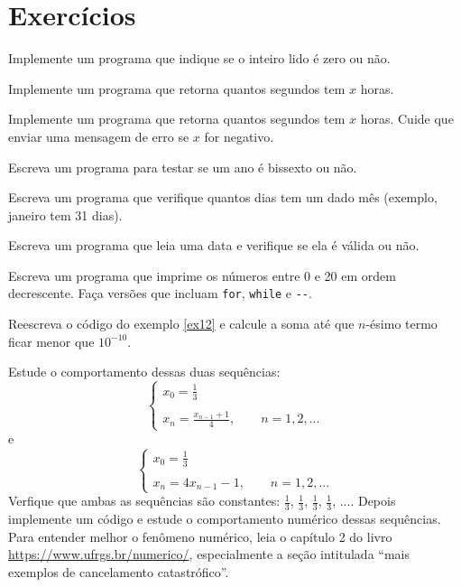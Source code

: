 \section{Exercícios}
\begin{exer}Implemente um programa que indique se o inteiro lido é zero ou não.
\end{exer}
\begin{exer}Implemente um programa que retorna quantos segundos tem $x$ horas.
\end{exer}
\begin{exer}Implemente um programa que retorna quantos segundos tem $x$ horas. Cuide que enviar uma mensagem de erro se $x$ for negativo.
\end{exer}
\begin{exer}\label{exerc3.1}Escreva um programa para testar se um ano é bissexto ou não.
\end{exer}
\begin{exer}\label{exerc3.2}Escreva um programa que verifique quantos dias tem um dado mês (exemplo, janeiro tem 31 dias).
\end{exer}
\begin{exer}\label{exerc3.3}Escreva um programa que leia uma data e verifique se ela é válida ou não.
\end{exer}
\begin{exer}Escreva um programa que imprime os números entre 0 e 20 em ordem decrescente. Faça versões que incluam \verb|for|, \verb|while| e \verb|--|. 
\end{exer}
\begin{exer} Reescreva o código do exemplo \ref{ex12} e calcule a soma até que $n$-ésimo termo ficar menor que $10^{-10}$.
\end{exer}
\begin{exer} Estude o comportamento dessas duas sequências:
$$\left\{
\begin{array}{l}\displaystyle
 x_0=\frac{1}{3}\\\\ \displaystyle
 x_{n}=\frac{x_{n-1}+1}{4},\qquad n=1,2,...
\end{array}\right.
$$
e
$$\left\{
\begin{array}{l}\displaystyle
 x_0=\frac{1}{3}\\\\ \displaystyle
 x_{n}=4x_{n-1}-1,\qquad n=1,2,...
\end{array}\right.
$$
Verfique que ambas as sequências são constantes: $\frac{1}{3}$, $\frac{1}{3}$, $\frac{1}{3}$, $\frac{1}{3}$, $...$. Depois implemente um código e estude o comportamento numérico dessas sequências. Para entender melhor o fenômeno numérico, leia o capítulo 2 do livro \url{https://www.ufrgs.br/numerico/}, especialmente a seção intitulada ``mais exemplos de cancelamento catastrófico''.
\end{exer}\label{exerc4.1}
